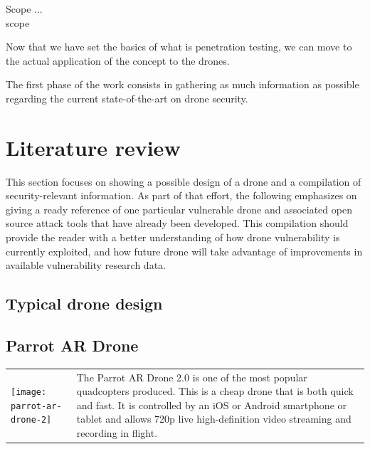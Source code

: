 \begin{chaptercover}{Scope}%
{
{\large \hyphenation{} \bigletter{}{} {\color{red} ...}\newline\\}}%
{scope}

Now that we have set the basics of what is penetration testing, we can move to the actual application of the concept to the drones. 

The first phase of the work consists in gathering as much information as possible regarding the current state-of-the-art on drone security.

\section{Literature review}

This section focuses on showing a possible design of a drone and a compilation of security-relevant information. As part of that effort, the following emphasizes on giving a ready reference of one particular vulnerable drone and associated open source attack tools that have already been developed. This compilation should provide the reader with a better understanding of how drone vulnerability is currently exploited, and how future drone will take advantage of improvements in available vulnerability research data.

\subsection{Typical drone design}



\subsection{Parrot AR Drone}

\begin{center}
\begin{tabular}{m{5cm}m{12.3cm}}
\hyphenation{produced}
\texttt{[image: parrot-ar-drone-2]} & The Parrot AR Drone 2.0 is one of the most popular quadcopters produced. This is a cheap drone that is both quick and fast. It is controlled by an iOS or Android smartphone or tablet and allows 720p live high-definition video streaming and recording in flight. \\
\end{tabular}
\end{center}


\end{chaptercover}
